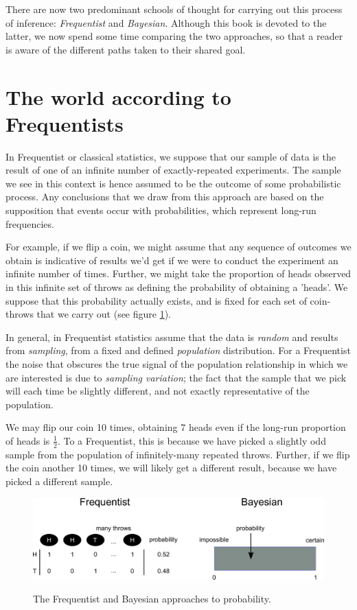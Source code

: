 \documentclass[11pt,fullpage]{book}
\begin{document}
There are now two predominant schools of thought for carrying out this process of inference: \textit{Frequentist} and \textit{Bayesian}. Although this book is devoted to the latter, we now spend some time comparing the two approaches, so that a reader is aware of the different paths taken to their shared goal.

\section{The world according to Frequentists}\label{sec:Intro_FrequentistsWorld}
In Frequentist or classical statistics, we suppose that our sample of data is the result of one of an infinite number of exactly-repeated experiments. The sample we see in this context is hence assumed to be the outcome of some probabilistic process. Any conclusions that we draw from this approach are based on the supposition that events occur with probabilities, which represent long-run frequencies. 

For example, if we flip a coin, we might assume that any sequence of outcomes we obtain is indicative of results we'd get if we were to conduct the experiment an infinite number of times. Further, we might take the proportion of heads observed in this infinite set of throws as defining the probability of obtaining a 'heads'. We suppose that this probability actually exists, and is fixed for each set of coin-throws that we carry out (see figure \ref{fig:Intro_FrequentistBayesProbability}).

In general, in Frequentist statistics assume that the data is \textit{random} and results from \textit{sampling}, from a fixed and defined \textit{population} distribution. For a Frequentist the noise that obscures the true signal of the population relationship in which we are interested is due to \textit{sampling variation}; the fact that the sample that we pick will each time be slightly different, and not exactly representative of the population. 

We may flip our coin 10 times, obtaining 7 heads even if the long-run proportion of heads is $\frac{1}{2}$. To a Frequentist, this is because we have picked a slightly odd sample from the population of infinitely-many repeated throws. Further, if we flip the coin another 10 times, we will likely get a different result, because we have picked a different sample.

\begin{figure}
\centering
\scalebox{0.3} 
{\includegraphics{Intro_FrequentistBayesProbability.pdf}}
\caption{The Frequentist and Bayesian approaches to probability.}\label{fig:Intro_FrequentistBayesProbability}
\end{figure}
\end{document}
